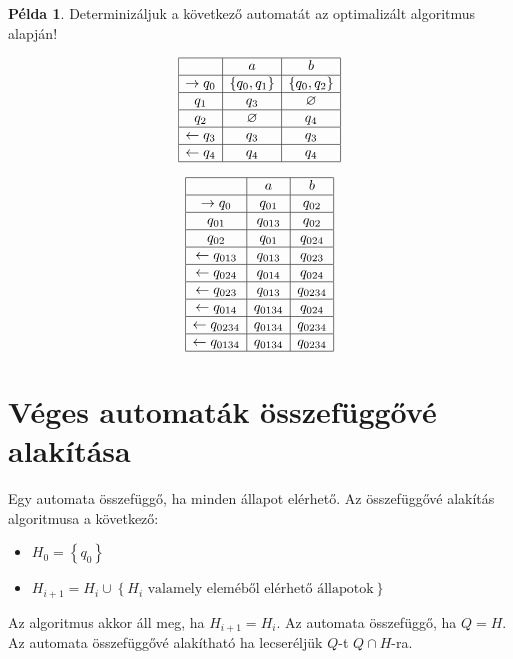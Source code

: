 \documentclass[a4paper,12pt]{article}
\theoremstyle{definition}
\newtheorem*{example}{Példa}
\begin{document}
	\begin{example}
		Determinizáljuk a következő automatát az optimalizált algoritmus alapján!
		
		\begin{multicols}{2}
			\begin{table}[H]
				\centering
				$$
				\begin{array}{|c|c|c|}
					\hline
					& a & b \\
					\hline
					\rightarrow q_0 & \left\lbrace q_0, q_1 \right\rbrace  & \left\lbrace q_0, q_2 \right\rbrace  \\
					\hline
					q_1 & q_3 & \varnothing  \\
					\hline
					q_2 & \varnothing & q_4   \\
					\hline
					\leftarrow q_3 & q_3 & q_3   \\
					\hline
					\leftarrow q_4 & q_4 & q_4   \\
					\hline
				\end{array}
				$$
			\end{table}
			\begin{table}[H]
				\centering
				$$
				\begin{array}{|c|c|c|}
					\hline
					& a & b \\
					\hline
					\rightarrow q_0 & q_{01} & q_{02} \\
					\hline
					q_{01} & q_{013} & q_{02}  \\
					\hline
					q_{02} & q_{01} & q_{024}   \\
					\hline
					\leftarrow q_{013} & q_{013} & q_{023}   \\
					\hline
					\leftarrow q_{024} & q_{014} & q_{024}   \\
					\hline
					\leftarrow q_{023} & q_{013} & q_{0234}   \\
					\hline
					\leftarrow q_{014} & q_{0134} & q_{024}   \\
					\hline
					\leftarrow q_{0234} & q_{0134} & q_{0234}   \\
					\hline
					\leftarrow q_{0134} & q_{0134} & q_{0234}   \\
					\hline
				\end{array}
				$$
			\end{table}
		\end{multicols}
	\end{example}
	\newpage
	\section{Véges automaták összefüggővé alakítása}
	Egy automata összefüggő, ha minden állapot elérhető. Az összefüggővé alakítás algoritmusa a következő:
	\begin{itemize}
		\item $ H_0 = \left\lbrace q_0 \right\rbrace $
		\item $ H_{i+1} = H_i \cup \left\lbrace H_i \text{ valamely eleméből elérhető állapotok} \right\rbrace $ 
	\end{itemize}
	Az algoritmus akkor áll meg, ha $ H_{i+1} = H_i $. Az automata összefüggő, ha $ Q = H $. Az automata összefüggővé alakítható ha lecseréljük $ Q $-t $Q \cap H$-ra.
\end{document}
